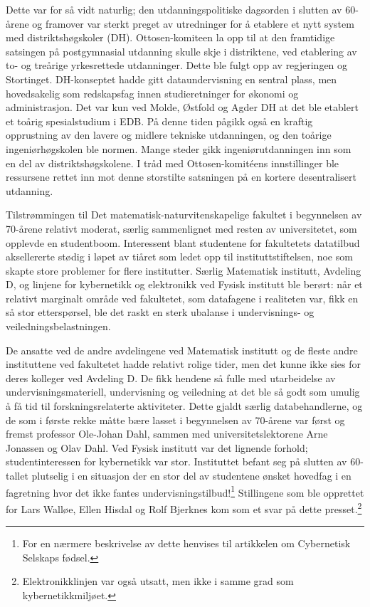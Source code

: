 Dette var for så vidt naturlig; den utdanningspolitiske dagsorden i slutten av 60-årene og framover var sterkt preget av utredninger for å etablere et nytt system med distriktshøgskoler (DH). Ottosen-komiteen la opp til at den framtidige satsingen på postgymnasial utdanning skulle skje i distriktene, ved etablering av to- og treårige yrkesrettede utdanninger. Dette ble fulgt opp av regjeringen og Stortinget. DH-konseptet hadde gitt dataundervisning en sentral plass, men hovedsakelig som redskapsfag innen studieretninger for økonomi og administrasjon. Det var kun ved Molde, Østfold og Agder DH at det ble etablert et toårig spesialstudium i EDB. På denne tiden pågikk også en kraftig opprustning av den lavere og midlere tekniske utdanningen, og den toårige ingeniørhøgskolen ble normen. Mange steder gikk ingeniørutdanningen inn som en del av distriktshøgskolene. I tråd med Ottosen-komitéens innstillinger ble ressursene rettet inn mot denne storstilte satsningen på en kortere desentralisert utdanning.

Tilstrømmingen til Det matematisk-naturvitenskapelige fakultet i begynnelsen av 70-årene relativt moderat, særlig sammenlignet med resten av universitetet, som opplevde en studentboom. Interessent blant studentene for fakultetets datatilbud aksellererte stødig i løpet av tiåret som ledet opp til instituttstiftelsen, noe som skapte store problemer for flere institutter. Særlig Matematisk institutt, Avdeling D, og linjene for kybernetikk og elektronikk ved Fysisk institutt ble berørt: når et relativt marginalt område ved fakultetet, som datafagene i realiteten var, fikk en så stor etterspørsel, ble det raskt en sterk ubalanse i undervisnings- og veiledningsbelastningen. 

De ansatte ved de andre avdelingene ved Matematisk institutt og de fleste andre instituttene ved fakultetet hadde relativt rolige tider, men det kunne ikke sies for deres kolleger ved Avdeling D. De fikk hendene så fulle med utarbeidelse av undervisningsmateriell, undervisning og veiledning at det ble så godt som umulig å få tid til forskningsrelaterte aktiviteter. Dette gjaldt særlig databehandlerne, og de som i første rekke måtte bære lasset i begynnelsen av 70-årene var først og fremst professor Ole-Johan Dahl, sammen med universitetslektorene Arne Jonassen og Olav Dahl. Ved Fysisk institutt var det lignende forhold; studentinteressen for kybernetikk var stor. Instituttet befant seg på slutten av 60-tallet plutselig i en situasjon der en stor del av studentene ønsket hovedfag i en fagretning hvor det ikke fantes undervisningstilbud!\footnote{For en nærmere beskrivelse av dette henvises til artikkelen om Cybernetisk Selskaps fødsel.} Stillingene som ble opprettet for Lars Walløe, Ellen Hisdal og Rolf Bjerknes kom som et svar på dette presset.\footnote{Elektronikklinjen  var  også  utsatt,  men  ikke  i  samme  grad  som  kybernetikkmiljøet.} 


